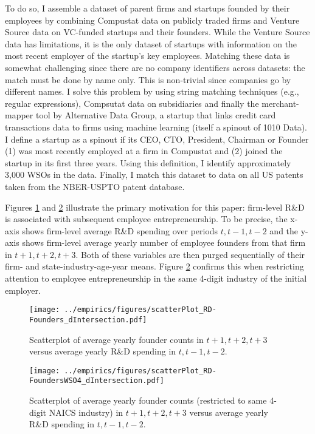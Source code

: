 \documentclass[11pt,english]{article}
\begin{document}
To do so, I assemble a dataset of parent firms and startups founded by their employees by combining Compustat data on publicly traded firms and Venture Source data on VC-funded startups and their founders. While the Venture Source data has limitations, it is the only dataset of startups with information on the most recent employer of the startup's key employees. Matching these data is somewhat challenging since there are no company identifiers across datasets: the match must be done by name only. This is non-trivial since companies go by different names. I solve this problem by using string matching techniques (e.g., regular expressions), Compsutat data on subsidiaries and finally the merchant-mapper tool by Alternative Data Group, a startup that links credit card transactions data to firms using machine learning (itself a spinout of 1010 Data). I define a startup as a spinout if its CEO, CTO, President, Chairman or Founder (1) was most recently employed at a firm in Compustat and (2) joined the startup in its first three years. Using this definition, I identify approximately 3,000 WSOs in the data. Finally, I match this dataset to data on all US patents taken from the NBER-USPTO patent database.

Figures \ref{figure:scatterPlot_RD-Founders_dIntersection} and \ref{figure:scatterPlot_RD-FoundersWSO4_dIntersection} illustrate the primary motivation for this paper: firm-level R\&D is associated with subsequent employee entrepreneurship. To be precise, the x-axis shows firm-level average R\&D spending over periods $t,t-1,t-2$ and the y-axis shows firm-level average yearly number of employee founders from that firm in $t+1,t+2,t+3$. Both of these variables are then purged sequentially of their firm- and state-industry-age-year means. Figure \ref{figure:scatterPlot_RD-FoundersWSO4_dIntersection} confirms this when restricting attention to employee entrepreneurship in the same 4-digit industry of the initial employer. 

\begin{figure}[]
	\centering
	\texttt{[image: ../empirics/figures/scatterPlot\_RD-Founders\_dIntersection.pdf]}
	\caption{Scatterplot of average yearly founder counts in $t+1,t+2,t+3$ versus average yearly R\&D spending in $t,t-1,t-2$.}
	\label{figure:scatterPlot_RD-Founders_dIntersection}
\end{figure}

\begin{figure}[]
	\centering
	\texttt{[image: ../empirics/figures/scatterPlot\_RD-FoundersWSO4\_dIntersection.pdf]}
	\caption{Scatterplot of average yearly founder counts (restricted to same 4-digit NAICS industry) in $t+1,t+2,t+3$ versus average yearly R\&D spending in $t,t-1,t-2$.}
	\label{figure:scatterPlot_RD-FoundersWSO4_dIntersection}
\end{figure}
\end{document}
